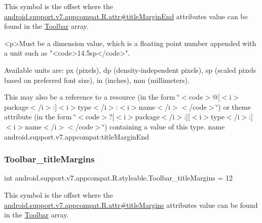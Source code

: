 This symbol is the offset where the \hyperlink{classandroid_1_1support_1_1v7_1_1appcompat_1_1R_1_1attr_a4bfe0ae1fc33a1dcc037e2c098be342c}{android.\+support.\+v7.\+appcompat.\+R.\+attr\#title\+Margin\+End} attribute\textquotesingle{}s value can be found in the \hyperlink{classandroid_1_1support_1_1v7_1_1appcompat_1_1R_1_1styleable_a2daba9587ef9f700f2d54cf13435cb32}{Toolbar} array.

\begin{DoxyVerb}      <p>Must be a dimension value, which is a floating point number appended with a unit such as "<code>14.5sp</code>".
\end{DoxyVerb}
 Available units are\+: px (pixels), dp (density-\/independent pixels), sp (scaled pixels based on preferred font size), in (inches), mm (millimeters). 

This may also be a reference to a resource (in the form \char`\"{}$<$code$>$@\mbox{[}$<$i$>$package$<$/i$>$\+:\mbox{]}$<$i$>$type$<$/i$>$\+:$<$i$>$name$<$/i$>$$<$/code$>$\char`\"{}) or theme attribute (in the form \char`\"{}$<$code$>$?\mbox{[}$<$i$>$package$<$/i$>$\+:\mbox{]}\mbox{[}$<$i$>$type$<$/i$>$\+:\mbox{]}$<$i$>$name$<$/i$>$$<$/code$>$\char`\"{}) containing a value of this type.  name android.\+support.\+v7.\+appcompat\+:title\+Margin\+End \mbox{\label{classandroid_1_1support_1_1v7_1_1appcompat_1_1R_1_1styleable_aeae44f37b9e7934071b303e4412587c2}} 
\subsubsection{\texorpdfstring{Toolbar\+\_\+title\+Margins}{Toolbar\_titleMargins}}
{\footnotesize\ttfamily int android.\+support.\+v7.\+appcompat.\+R.\+styleable.\+Toolbar\+\_\+title\+Margins = 12\hspace{0.3cm}{\ttfamily [static]}}

This symbol is the offset where the \hyperlink{classandroid_1_1support_1_1v7_1_1appcompat_1_1R_1_1attr_ad8d424270f154ae84996d3d49a832ee6}{android.\+support.\+v7.\+appcompat.\+R.\+attr\#title\+Margins} attribute\textquotesingle{}s value can be found in the \hyperlink{classandroid_1_1support_1_1v7_1_1appcompat_1_1R_1_1styleable_a2daba9587ef9f700f2d54cf13435cb32}{Toolbar} array.

